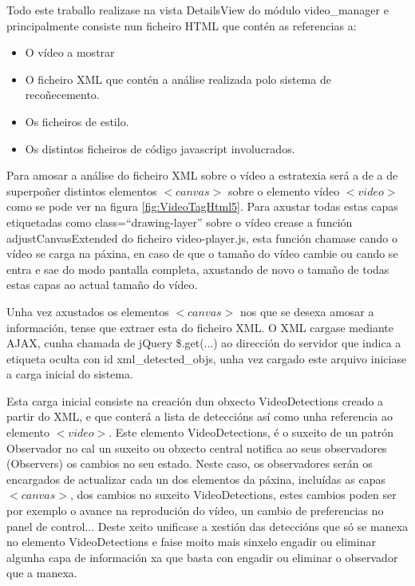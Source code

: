 	Todo este traballo realizase na vista DetailsView do módulo video\_manager e principalmente 
	consiste nun ficheiro HTML que contén as referencias a:
	\begin{itemize}
     \item O vídeo a mostrar
     \item O ficheiro XML que contén a análise realizada polo sistema de recoñecemento.
     \item Os ficheiros de estilo.
     \item Os distintos ficheiros de código javascript involucrados.
    \end{itemize}
    
    Para amosar a análise do ficheiro XML sobre o vídeo a estratexia será a de a de superpoñer 
    distintos elementos $<canvas>$ sobre o elemento vídeo $<video>$ como se pode ver na figura 
    \ref{fig:VideoTagHtml5}. Para axustar todas estas capas etiquetadas como class=``drawing-layer''
    sobre o vídeo crease a función adjustCanvasExtended do ficheiro video-player.js, esta función 
    chamase cando o vídeo se carga na páxina, en caso de que o tamaño do vídeo cambie ou cando se 
    entra e sae do modo pantalla completa, axustando de novo o tamaño de todas estas capas ao actual
    tamaño do vídeo.
    
    Unha vez axustados os elementos $<canvas>$ nos que se desexa amosar a información, tense que 
    extraer esta do ficheiro XML. O XML cargase mediante AJAX, cunha chamada de jQuery \$.get(...) 
    ao dirección do servidor que indica a etiqueta oculta con id xml\_detected\_objs, unha vez cargado
    este arquivo iniciase a carga inicial do sistema.
    
    Esta carga inicial consiste na creación dun obxecto VideoDetections creado a partir do XML, e
    que conterá a lista de deteccións así como unha referencia ao elemento $<video>$. Este elemento
    VideoDetections, é o suxeito de un patrón Observador no cal un suxeito ou obxecto central
    notifica ao seus observadores (Observers) os cambios no seu estado. Neste caso, os observadores
    serán os encargados de actualizar cada un dos elementos da páxina, incluídas as capas $<canvas>$,
    dos cambios no suxeito VideoDetections, estes cambios poden ser por exemplo o avance na 
    reprodución do vídeo, un cambio de preferencias no panel de control... Deste xeito unificase a 
    xestión das deteccións que só se manexa no elemento VideoDetections e faise moito mais sinxelo 
    engadir ou eliminar algunha capa de información xa que basta con engadir ou eliminar o 
    observador que a manexa.
    
